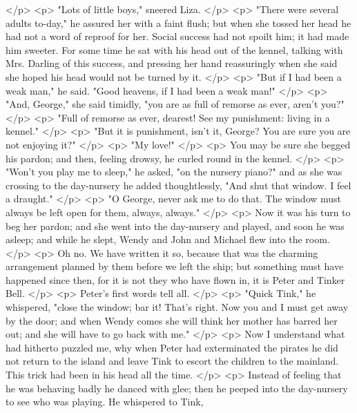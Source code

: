     </p>
    <p>
      "Lots of little boys," sneered Liza.
    </p>
    <p>
      "There were several adults to-day," he assured her with a faint flush; but
      when she tossed her head he had not a word of reproof for her. Social
      success had not spoilt him; it had made him sweeter. For some time he sat
      with his head out of the kennel, talking with Mrs. Darling of this
      success, and pressing her hand reassuringly when she said she hoped his
      head would not be turned by it.
    </p>
    <p>
      "But if I had been a weak man," he said. "Good heavens, if I had been a
      weak man!"
    </p>
    <p>
      "And, George," she said timidly, "you are as full of remorse as ever,
      aren't you?"
    </p>
    <p>
      "Full of remorse as ever, dearest! See my punishment: living in a kennel."
    </p>
    <p>
      "But it is punishment, isn't it, George? You are sure you are not enjoying
      it?"
    </p>
    <p>
      "My love!"
    </p>
    <p>
      You may be sure she begged his pardon; and then, feeling drowsy, he curled
      round in the kennel.
    </p>
    <p>
      "Won't you play me to sleep," he asked, "on the nursery piano?" and as she
      was crossing to the day-nursery he added thoughtlessly, "And shut that
      window. I feel a draught."
    </p>
    <p>
      "O George, never ask me to do that. The window must always be left open
      for them, always, always."
    </p>
    <p>
      Now it was his turn to beg her pardon; and she went into the day-nursery
      and played, and soon he was asleep; and while he slept, Wendy and John and
      Michael flew into the room.
    </p>
    <p>
      Oh no. We have written it so, because that was the charming arrangement
      planned by them before we left the ship; but something must have happened
      since then, for it is not they who have flown in, it is Peter and Tinker
      Bell.
    </p>
    <p>
      Peter's first words tell all.
    </p>
    <p>
      "Quick Tink," he whispered, "close the window; bar it! That's right. Now
      you and I must get away by the door; and when Wendy comes she will think
      her mother has barred her out; and she will have to go back with me."
    </p>
    <p>
      Now I understand what had hitherto puzzled me, why when Peter had
      exterminated the pirates he did not return to the island and leave Tink to
      escort the children to the mainland. This trick had been in his head all
      the time.
    </p>
    <p>
      Instead of feeling that he was behaving badly he danced with glee; then he
      peeped into the day-nursery to see who was playing. He whispered to Tink,
